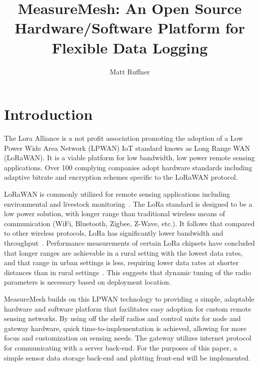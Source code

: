 \documentclass{IEEEtran}
\title{MeasureMesh: An Open Source Hardware/Software Platform for Flexible Data Logging}
\author{Matt Ruffner}
\date{}
\begin{document}
\maketitle




\section{Introduction}
 The Lora Alliance is a not profit association promoting the adoption of a Low Power Wide Area Network (LPWAN) IoT standard knows as Long Range WAN (LoRaWAN). It is a viable platform for low bandwidth, low power remote sensing applications. Over 100 complying companies adopt hardware standards including adaptive bitrate and encryption schemes specific to the LoRaWAN protocol.
 
LoRaWAN is commonly utilized for remote sensing applications including environmental and livestock monitoring~\cite{WuFan2018WAwI,IkhsanMukhammadGufron2018MLGf}. The LoRa standard is designed to be a low power solution, with longer range than traditional wireless means of communication (WiFi, Bluetooth, Zigbee, Z-Wave, etc.). It follows that compared to other wireless protocols, LoRa has significantly lower bandwidth and throughput~\cite{WuFan2018WAwI}. Performance measurements of certain LoRa chipsets have concluded that longer ranges are achievable in a rural setting with the lowest data rates, and that range in urban settings is less, requiring lower data rates at shorter distances than in rural settings~\cite{RamonSanchez-Iborra2018PEoL}. This suggests that dynamic tuning of the radio parameters is necessary based on deployment location. 

MeasureMesh builds on this LPWAN technology to providing a simple, adaptable hardware and software platform that facilitates easy adoption for custom remote sensing networks. By using off the shelf radios and control units for node and gateway hardware, quick time-to-implementation is achieved, allowing for more focus and customization on sensing needs. The gateway utilizes internet protocol for communicating with a server back-end. For the purposes of this paper, a simple sensor data storage back-end and plotting front-end will be implemented.
\end{document}
